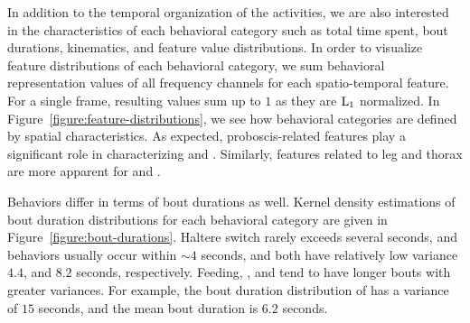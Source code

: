 In addition to the temporal organization of the activities, we are also interested in the characteristics of each behavioral category such as total time spent, bout durations, kinematics, and feature value distributions.
In order to visualize feature distributions of each behavioral category, we sum behavioral representation values of all frequency channels for each spatio-temporal feature.
For a single frame, resulting values sum up to $1$ as they are $\textnormal{L}_1$ normalized.
In Figure~\ref{figure:feature-distributions}, we see how behavioral categories are defined by spatial characteristics.
As expected, proboscis-related features play a significant role in characterizing \Feeding and \ProboscisPumping.
Similarly, features related to leg and thorax are more apparent for \Grooming and \PosturalAdjustment.

Behaviors differ in terms of bout durations as well.
Kernel density estimations of bout duration distributions for each behavioral category are given in Figure~\ref{figure:bout-durations}.
Haltere switch rarely exceeds several seconds, and \PosturalAdjustment behaviors usually occur within ${\sim}4$ seconds, and both have relatively low variance $4.4$, and $8.2$ seconds, respectively.
Feeding, \ProboscisPumping, and \Grooming tend to have longer bouts with greater variances.
For example, the bout duration distribution of \Grooming has a variance of $15$ seconds, and the mean bout duration is $6.2$ seconds.

